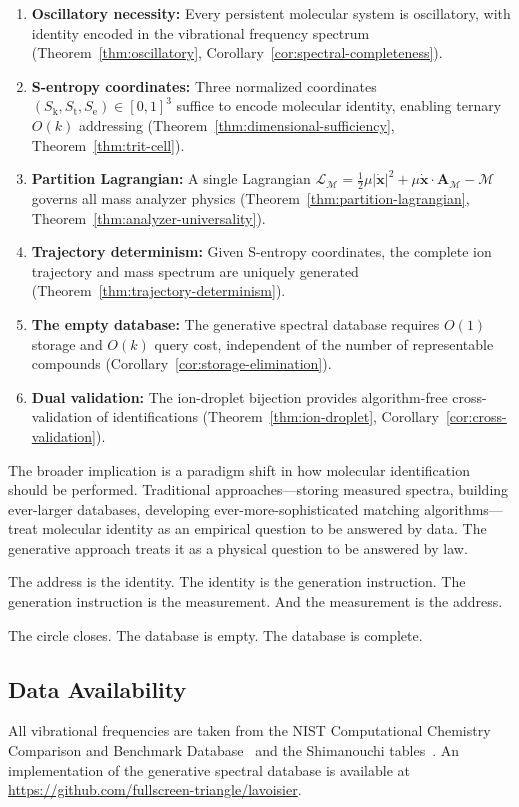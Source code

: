 \documentclass[11pt,twocolumn,a4paper]{article}
\theoremstyle{definition}
\theoremstyle{remark}
\newcommand{\Sk}{S_{\mathrm{k}}}
\newcommand{\St}{S_{\mathrm{t}}}
\newcommand{\Se}{S_{\mathrm{e}}}
\newcommand{\Depth}{\mathcal{M}}
\newcommand{\partinert}{\mu}
\newcommand{\Apartition}{\mathbf{A}_{\mathcal{M}}}
\newcommand{\Lagr}{\mathcal{L}}
\begin{document}
\begin{enumerate}
  \item \textbf{Oscillatory necessity:} Every persistent molecular system is oscillatory, with identity encoded in the vibrational frequency spectrum (Theorem~\ref{thm:oscillatory}, Corollary~\ref{cor:spectral-completeness}).

  \item \textbf{S-entropy coordinates:} Three normalized coordinates $(\Sk, \St, \Se) \in [0,1]^3$ suffice to encode molecular identity, enabling ternary $O(k)$ addressing (Theorem~\ref{thm:dimensional-sufficiency}, Theorem~\ref{thm:trit-cell}).

  \item \textbf{Partition Lagrangian:} A single Lagrangian $\Lagr_\Depth = \tfrac{1}{2}\partinert|\dot{\mathbf{x}}|^2 + \partinert\dot{\mathbf{x}}\cdot\Apartition - \Depth$ governs all mass analyzer physics (Theorem~\ref{thm:partition-lagrangian}, Theorem~\ref{thm:analyzer-universality}).

  \item \textbf{Trajectory determinism:} Given S-entropy coordinates, the complete ion trajectory and mass spectrum are uniquely generated (Theorem~\ref{thm:trajectory-determinism}).

  \item \textbf{The empty database:} The generative spectral database requires $O(1)$ storage and $O(k)$ query cost, independent of the number of representable compounds (Corollary~\ref{cor:storage-elimination}).

  \item \textbf{Dual validation:} The ion-droplet bijection provides algorithm-free cross-validation of identifications (Theorem~\ref{thm:ion-droplet}, Corollary~\ref{cor:cross-validation}).
\end{enumerate}

The broader implication is a paradigm shift in how molecular identification should be performed. Traditional approaches---storing measured spectra, building ever-larger databases, developing ever-more-sophisticated matching algorithms---treat molecular identity as an empirical question to be answered by data. The generative approach treats it as a physical question to be answered by law.

The address is the identity. The identity is the generation instruction. The generation instruction is the measurement. And the measurement is the address.

The circle closes. The database is empty. The database is complete.

\subsection*{Data Availability}
All vibrational frequencies are taken from the NIST Computational Chemistry Comparison and Benchmark Database~\citep{johnson2022} and the Shimanouchi tables~\citep{shimanouchi1972}. An implementation of the generative spectral database is available at \url{https://github.com/fullscreen-triangle/lavoisier}.



\end{document}
